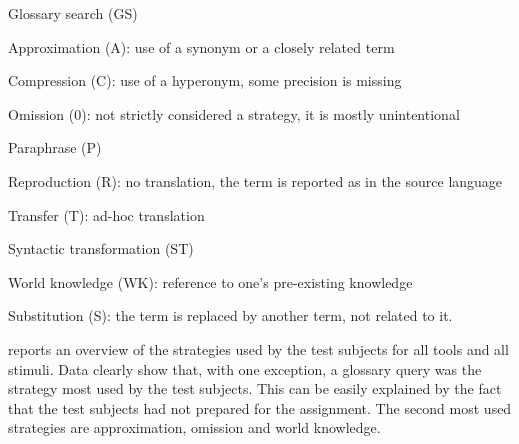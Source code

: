 \documentclass[output=paper]{langsci/langscibook}
\begin{document}
\begin{stylelsEnumerated}
Glossary search (GS)
\end{stylelsEnumerated}

\begin{stylelsEnumerated}
Approximation (A): use of a synonym or a closely related term
\end{stylelsEnumerated}

\begin{stylelsEnumerated}
Compression (C): use of a hyperonym, some precision is missing
\end{stylelsEnumerated}

\begin{stylelsEnumerated}
Omission (0): not strictly considered a strategy, it is mostly unintentional
\end{stylelsEnumerated}

\begin{stylelsEnumerated}
Paraphrase (P)
\end{stylelsEnumerated}

\begin{stylelsEnumerated}
Reproduction (R): no translation, the term is reported as in the source language
\end{stylelsEnumerated}

\begin{stylelsEnumerated}
Transfer (T): ad-hoc translation
\end{stylelsEnumerated}

\begin{stylelsEnumerated}
Syntactic transformation (ST)
\end{stylelsEnumerated}

\begin{stylelsEnumerated}
World knowledge (WK): reference to one’s pre-existing knowledge
\end{stylelsEnumerated}

\begin{stylelsEnumerated}
Substitution (S): the term is replaced by another term, not related to it.
\end{stylelsEnumerated}

 reports an overview of the strategies used by the test subjects for all tools and all stimuli. Data clearly show that, with one exception, a glossary query was the strategy most used by the test subjects. This can be easily explained by the fact that the test subjects had not prepared for the assignment. The second most used strategies are approximation, omission and world knowledge.
\end{document}
